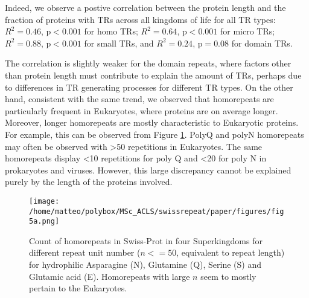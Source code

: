 \documentclass[a4,center,fleqn]{NAR}
\begin{document}
Indeed, we observe a postive correlation between the protein length and the fraction of proteins with TRs across all kingdoms of life for all TR types: 
$R^2 = 0.46$, p$<0.001$ for homo TRs;
$R^2 = 0.64$, p$<0.001$ for micro TRs; 
$R^2 = 0.88$, p$<0.001$ for small TRs, and 
$R^2 = 0.24$, p$=0.08$ for domain TRs.

The correlation is slightly weaker for the domain repeats, where factors other than protein length must contribute to explain the amount of TRs, perhaps due to differences in TR generating processes for different TR types. On the other hand, consistent with the same trend, we observed that homorepeats are particularly frequent in Eukaryotes, where proteins are on average longer. Moreover, longer homorepeats are mostly characteristic to Eukaryotic proteins. For example, this can be observed from Figure \ref{fig5a}. PolyQ and polyN homorepeats may often be observed with >50 repetitions in Eukaryotes. The same homorepeats display <10 repetitions for poly Q and <20 for poly N in prokaryotes and viruses. However, this large discrepancy cannot be explained purely by the length of the proteins involved. 

\begin{figure}[t]
\begin{center}
\texttt{[image: /home/matteo/polybox/MSc\_ACLS/swissrepeat/paper/figures/fig5a.png]}
\end{center}
\caption{Count of homorepeats in Swiss-Prot in four Superkingdoms for different repeat unit number ($n <= 50$, equivalent to repeat length) for hydrophilic Asparagine (N), Glutamine (Q), Serine (S) and Glutamic acid (E). Homorepeats with large $n$ seem to mostly pertain to the Eukaryotes. }
\label{fig5a}
\end{figure}

%
\end{document}
